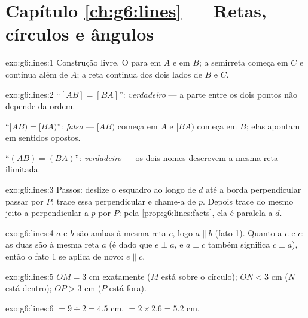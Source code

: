 \section*{Capítulo \ref{ch:g6:lines} --- Retas, círculos e ângulos}

\begin{solution}{exo:g6:lines:1}
Construção livre. O  para em $A$ e em $B$; a semirreta começa
em $C$ e continua além de $A$; a reta continua dos dois lados de $B$ e
$C$.
\end{solution}

\begin{solution}{exo:g6:lines:2}
``$[AB] = [BA]$'': \emph{verdadeiro} --- a parte entre os dois pontos
não depende da ordem.

``$[AB) = [BA)$'': \emph{falso} --- $[AB)$ começa em $A$ e $[BA)$
começa em $B$; elas apontam em sentidos opostos.

``$(AB) = (BA)$'': \emph{verdadeiro} --- os dois nomes descrevem a
mesma reta ilimitada.
\end{solution}

\begin{solution}{exo:g6:lines:3}
Passos: deslize o esquadro ao longo de $d$ até a borda perpendicular
passar por $P$; trace essa perpendicular e chame-a de $p$. Depois trace
do mesmo jeito a perpendicular a $p$ por $P$: pela
\cref{prop:g6:lines:facts}, ela é paralela a $d$.
\end{solution}

\begin{solution}{exo:g6:lines:4}
$a$ e $b$ são ambas  à mesma reta $c$, logo
$a \parallel b$ (fato 1). Quanto a $e$ e $c$: as duas são
 à mesma reta $a$ (é dado que $e \perp a$, e $a \perp c$
também significa $c \perp a$), então o fato 1 se aplica de novo:
$e \parallel c$.
\end{solution}

\begin{solution}{exo:g6:lines:5}
$OM = 3$ cm exatamente ($M$ está sobre o círculo); $ON < 3$ cm ($N$
está dentro); $OP > 3$ cm ($P$ está fora).
\end{solution}

\begin{solution}{exo:g6:lines:6}
 $= 9 \div 2 = 4.5$ cm. \quad {} $= 2 \times 2.6 = 5.2$ cm.
\end{solution}


